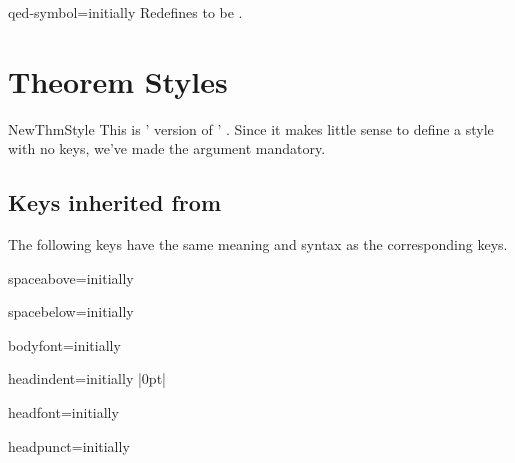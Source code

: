 \documentclass{ltxdoc}
\newcommand{\ttbrackets}[1]{\brackets{\texttt{#1}}}
\begin{document}
\begin{docKey}{qed-symbol}{=}{initially }
Redefines  to be .
\end{docKey}

\section{Theorem Styles}

\begin{docCommand}{NewThmStyle}{}
This is ' version of ' . Since it makes little sense to define a style with no keys, we've made the  argument mandatory.
\end{docCommand}

\subsection{Keys inherited from }

The following keys have the same meaning and syntax as the corresponding  keys.

\begin{docKey}{spaceabove}{=}{initially }

\end{docKey}

\begin{docKey}{spacebelow}{=}{initially }

\end{docKey}

\begin{docKey}{bodyfont}{=}{initially }

\end{docKey}

\begin{docKey}{headindent}{=}{initially |0pt|}

\end{docKey}

\begin{docKey}{headfont}{=}{initially }

\end{docKey}

\begin{docKey}{headpunct}{=}{initially \ttbrackets{.}}

\end{docKey}
\end{document}

